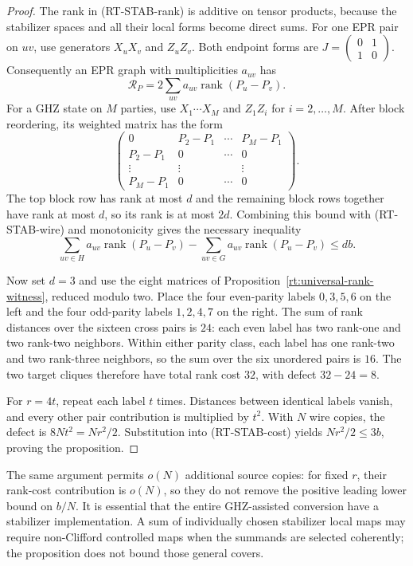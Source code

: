 \begin{proof}
The rank in (RT-STAB-rank) is additive on tensor products,
because the stabilizer spaces and all their local forms become
direct sums. For one EPR pair on $uv$, use generators $X_uX_v$
and $Z_uZ_v$. Both endpoint forms are
$J=\left(\begin{smallmatrix}0&1\\1&0\end{smallmatrix}\right)$.
Consequently an EPR graph with multiplicities $a_{uv}$ has
\[
 \mathcal R_P=2\sum_{uv}a_{uv}
                      \operatorname{rank}(P_u-P_v).
 \tag{RT-STAB-wire}
\]
For a GHZ state on $M$ parties, use $X_1\cdots X_M$ and
$Z_1Z_i$ for $i=2,\ldots,M$. After block reordering, its
weighted matrix has the form
\[
 \begin{pmatrix}
 0&P_2-P_1&\cdots&P_M-P_1\\
 P_2-P_1&0&\cdots&0\\
 \vdots&\vdots&&\vdots\\
 P_M-P_1&0&\cdots&0
 \end{pmatrix}.
\]
The top block row has rank at most $d$ and the remaining block
rows together have rank at most $d$, so its rank is at most
$2d$. Combining this bound with (RT-STAB-wire) and monotonicity
gives the necessary inequality
\[
 \sum_{uv\in H}a_{uv}\operatorname{rank}(P_u-P_v)
 -\sum_{uv\in G}a_{uv}\operatorname{rank}(P_u-P_v)
 \le db.
 \tag{RT-STAB-cost}
\]

Now set $d=3$ and use the eight matrices of
Proposition~\ref{rt:universal-rank-witness}, reduced modulo two.
Place the four even-parity labels $0,3,5,6$ on the left
and the four odd-parity labels $1,2,4,7$ on the right.
The sum of rank distances over the sixteen cross pairs is
$24$: each even label has two rank-one and two rank-two
neighbors. Within either parity class, each label has one
rank-two and two rank-three neighbors, so the sum over the
six unordered pairs is $16$. The two target cliques therefore
have total rank cost $32$, with defect $32-24=8$.

For $r=4t$, repeat each label $t$ times. Distances between
identical labels vanish, and every other pair contribution is
multiplied by $t^2$. With $N$ wire copies, the defect is
$8Nt^2=Nr^2/2$. Substitution into (RT-STAB-cost) yields
$Nr^2/2\le3b$, proving the proposition.
\end{proof}

The same argument permits $o(N)$ additional source copies:
for fixed $r$, their rank-cost contribution is $o(N)$, so they
do not remove the positive leading lower bound on $b/N$.
It is essential that the entire GHZ-assisted conversion have
a stabilizer implementation. A sum of individually chosen
stabilizer local maps may require non-Clifford controlled maps
when the summands are selected coherently; the proposition
does not bound those general covers.


